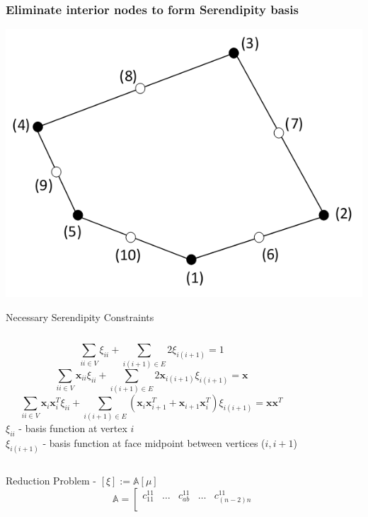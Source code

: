 \documentclass[compress,10pt]{beamer}
\renewcommand{\vec}[1]{\mathbf{#1}}
\begin{document}
\begin{frame}[t]\frametitle{Eliminate interior nodes to form Serendipity basis}
{
\centering
{}\includegraphics[width=0.75\columnwidth]{images/rand_ser_numbering.png} 
}
{
\begin{block}{Necessary Serendipity Constraints}{\small
\begin{columns}
\begin{equation*}
\sum_{ii \in V} \xi_{ii} + \sum_{i(i+1) \in E} 2 \xi_{i(i+1)} = 1
\end{equation*}
\begin{equation*}
\sum_{ii \in V} \vec{x}_{ii} \xi_{ii} + \sum_{i(i+1) \in E} 2 \vec{x}_{i(i+1)} \xi_{i(i+1)} = \vec{x}
\end{equation*}
\begin{equation*}
\sum_{ii \in V} \vec{x}_{i} \vec{x}_{i}^T \xi_{ii} + \sum_{i(i+1) \in E} \left(  \vec{x}_{i} \vec{x}_{i+1}^T + \vec{x}_{i+1} \vec{x}_{i}^T  \right) \xi_{i(i+1)} = \vec{x} \vec{x}^{T}
\end{equation*}
$\xi_{ii}$ - basis function at vertex $i$\\ \vspace{1mm}
$\xi_{i(i+1)}$ - basis function at face midpoint between vertices ($i, i+1$)
\end{columns}
}\end{block}
\begin{block}{Reduction Problem - $\left[ \xi \right] := \mathbb{A}  \left[ \mu \right]$}{\small
\begin{equation*}
\mathbb{A} = 
\left[
\begin{array}{ccccc}
c_{11}^{11} & \ldots & c_{ab}^{11} & \ldots & c_{(n-2)n}^{11} \\

\end{array}
\end{equation*}}
\end{block}}
\end{frame}
\end{document}
